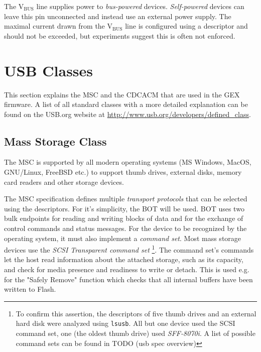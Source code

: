 The V$_\mathrm{BUS}$ line supplies power to \textit{bus-powered} devices. \textit{Self-powered} devices can leave this pin unconnected and instead use an external power supply. The maximal current drawn from the V$_\mathrm{BUS}$ line is configured using a descriptor and should not be exceeded, but experiments suggest this is often not enforced.

\section{USB Classes}

This section explains the \gls{MSC} and the \gls{CDCACM} that are used in the GEX firmware. A list of all standard classes with a more detailed explanation can be found on the USB.org website at \url{http://www.usb.org/developers/defined\_class}.

\subsection{Mass Storage Class}

The \gls{MSC} is supported by all modern operating systems (MS Windows, MacOS, GNU/Linux, FreeBSD etc.) to support thumb drives, external disks, memory card readers and other storage devices.


The \gls{MSC} specification defines multiple \textit{transport protocols} that can be selected using the descriptors. For it's simplicity, the \gls{BOT} will be used. \gls{BOT} uses two bulk endpoints for reading and writing blocks of data and for the exchange of control commands and status messages. For the device to be recognized by the operating system, it must also implement a \textit{command set}. Most mass storage devices use the \textit{\gls{SCSI} Transparent command set} 
\footnote{To confirm this assertion, the descriptors of five thumb drives and an external hard disk were analyzed using \verb|lsusb|. All but one device used the SCSI command set, one (the oldest thumb drive) used \textit{SFF-8070i}. A list of possible command sets can be found in TODO (usb spec overview)}.
The command set's commands let the host read information about the attached storage, such as its capacity, and check for media presence and readiness to write or detach. This is used e.g. for the "Safely Remove" function which checks that all internal buffers have been written to Flash.


